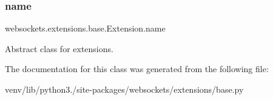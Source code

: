 \subsubsection{\texorpdfstring{name}{name}}
{\footnotesize\ttfamily websockets.\+extensions.\+base.\+Extension.\+name\hspace{0.3cm}{\ttfamily [static]}}

\begin{DoxyVerb}Abstract class for extensions.\end{DoxyVerb}
 

The documentation for this class was generated from the following file\+:\begin{DoxyCompactItemize}
\item 
venv/lib/python3./site-\/packages/websockets/extensions/base.\+py\end{DoxyCompactItemize}
